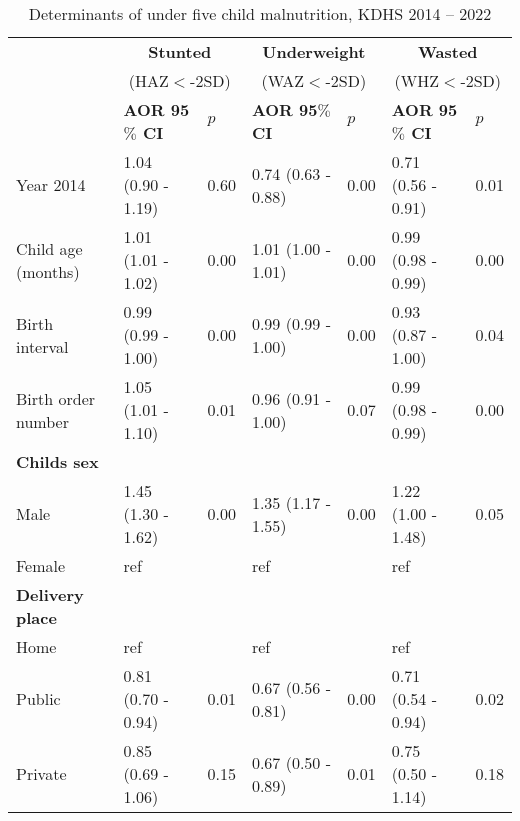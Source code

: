 \documentclass[sn-basic,Numbered,pdflatex]{sn-jnl}
\theoremstyle{remark}
\theoremstyle{definition}
\begin{document}
\renewcommand{\arraystretch}{0.8}
\begin{table}

\caption{\label{tab:four}Determinants of under five child malnutrition, KDHS 2014 -- 2022}
\centering
\begin{tabular}[t]{>{\raggedright\arraybackslash}p{2cm}llllll}
\toprule
\multicolumn{1}{c}{\textbf{ }} & \multicolumn{2}{c}{\textbf{Stunted}} & \multicolumn{2}{c}{\textbf{Underweight}} & \multicolumn{2}{c}{\textbf{Wasted}} \\
\multicolumn{1}{c}{ } & \multicolumn{2}{c}{(HAZ$<$-2SD)} & \multicolumn{2}{c}{(WAZ$<$-2SD)} & \multicolumn{2}{c}{(WHZ$<$-2SD)} \\
\cmidrule(l{0pt}r{0pt}){2-3} \cmidrule(l{0pt}r{0pt}){4-5} \cmidrule(l{0pt}r{0pt}){6-7}
\textbf{ } & \textbf{AOR 95$\%$ CI} & \textbf{$p$} & \textbf{AOR 95$\%$ CI} & \textbf{$p$} & \textbf{AOR 95$\%$ CI} & \textbf{$p$}\\
\midrule
Year 2014 & 1.04 (0.90 - 1.19) & 0.60 & 0.74 (0.63 - 0.88) & 0.00 & 0.71 (0.56 - 0.91) & 0.01\\
Child age (months) & 1.01 (1.01 - 1.02) & 0.00 & 1.01 (1.00 - 1.01) & 0.00 & 0.99 (0.98 - 0.99) & 0.00\\
Birth interval & 0.99 (0.99 - 1.00) & 0.00 & 0.99 (0.99 - 1.00) & 0.00 & 0.93 (0.87 - 1.00) & 0.04\\
Birth order number & 1.05 (1.01 - 1.10) & 0.01 & 0.96 (0.91 - 1.00) & 0.07 & 0.99 (0.98 - 0.99) & 0.00\\
\textbf{Childs sex} & \textbf{} & \textbf{} & \textbf{} & \textbf{} & \textbf{} & \textbf{}\\
\addlinespace
\hspace{1em}Male & 1.45 (1.30 - 1.62) & 0.00 & 1.35 (1.17 - 1.55) & 0.00 & 1.22 (1.00 - 1.48) & 0.05\\
\hspace{1em}Female & ref &  & ref &  & ref & \\
\textbf{Delivery place} & \textbf{} & \textbf{} & \textbf{} & \textbf{} & \textbf{} & \textbf{}\\
\hspace{1em}Home & ref &  & ref &  & ref & \\
\hspace{1em}Public & 0.81 (0.70 - 0.94) & 0.01 & 0.67 (0.56 - 0.81) & 0.00 & 0.71 (0.54 - 0.94) & 0.02\\
\addlinespace
\hspace{1em}Private & 0.85 (0.69 - 1.06) & 0.15 & 0.67 (0.50 - 0.89) & 0.01 & 0.75 (0.50 - 1.14) & 0.18\\

\end{tabular}
\end{table}
\end{document}
